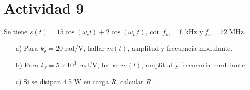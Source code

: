 \section{Actividad 9}

Se tiene $s(t)=15\cos(\omega_c t)+2\cos(\omega_m t)$, con $f_m=6$ kHz y $f_c=72$ MHz.  

\begin{itemize}
    \item[a)] Para $k_p=20$ rad/V, hallar $m(t)$, amplitud y frecuencia modulante.  
    \item[b)] Para $k_f=5\times 10^3$ rad/V, hallar $m(t)$, amplitud y frecuencia modulante.  
    \item[c)] Si se disipan 4.5 W en carga $R$, calcular $R$.  
\end{itemize}
